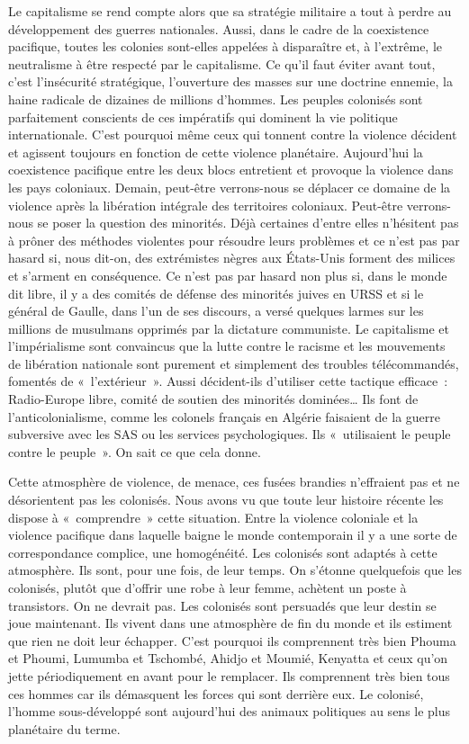 \documentclass[french,twoside]{book} %
\begin{document}
\noindent Le capitalisme se rend compte alors que sa stratégie militaire a tout à perdre au développement des guerres nationales. Aussi, dans le cadre de la coexistence pacifique, toutes les colonies sont-elles appelées à disparaître et, à l’extrême, le neutralisme à être respecté par le capitalisme. Ce qu’il faut éviter avant tout, c’est l’insécurité stratégique, l’ouverture des masses sur une doctrine ennemie, la haine radicale de dizaines de millions d’hommes. Les peuples colonisés sont parfaitement conscients de ces impératifs qui dominent la vie politique internationale.   C’est pourquoi même ceux qui tonnent contre la violence décident et agissent toujours en fonction de cette violence planétaire. Aujourd’hui la coexistence pacifique entre les deux blocs entretient et provoque la violence dans les pays coloniaux. Demain, peut-être verrons-nous se déplacer ce domaine de la violence après la libération intégrale des territoires coloniaux. Peut-être verrons-nous se poser la question des minorités. Déjà certaines d’entre elles n’hésitent pas à prôner des méthodes violentes pour résoudre leurs problèmes et ce n’est pas par hasard si, nous dit-on, des extrémistes nègres aux États-Unis forment des milices et s’arment en conséquence. Ce n’est pas par hasard non plus si, dans le monde dit libre, il y a des comités de défense des minorités juives en URSS et si le général de Gaulle, dans l’un de ses discours, a versé quelques larmes sur les millions de musulmans opprimés par la dictature communiste. Le capitalisme et l’impérialisme sont convaincus que la lutte contre le racisme et les mouvements de libération nationale sont purement et simplement des troubles télécommandés, fomentés de « l’extérieur ». Aussi décident-ils d’utiliser cette tactique efficace : Radio-Europe libre, comité de soutien des minorités dominées… Ils font de l’anticolonialisme, comme les colonels français en Algérie faisaient de la guerre subversive avec les SAS ou les services psychologiques. Ils « utilisaient le peuple contre le peuple ». On sait ce que cela donne.\par
Cette atmosphère de violence, de menace, ces fusées brandies n’effraient pas et ne désorientent pas les colonisés. Nous avons vu que toute leur histoire récente les dispose à « comprendre » cette situation. Entre la violence coloniale et la violence pacifique dans laquelle baigne le monde contemporain il y a une sorte de correspondance complice, une homogénéité. Les colonisés sont adaptés à cette atmosphère. Ils sont, pour une fois, de leur temps. On s’étonne quelquefois que les colonisés, plutôt que d’offrir une robe à leur femme, achètent un poste à transistors. On ne devrait pas. Les colonisés sont persuadés que leur destin se joue maintenant. Ils vivent dans une atmosphère   de fin du monde et ils estiment que rien ne doit leur échapper. C’est pourquoi ils comprennent très bien Phouma et Phoumi, Lumumba et Tschombé, Ahidjo et Moumié, Kenyatta et ceux qu’on jette périodiquement en avant pour le remplacer. Ils comprennent très bien tous ces hommes car ils démasquent les forces qui sont derrière eux. Le colonisé, l’homme sous-développé sont aujourd’hui des animaux politiques au sens le plus planétaire du terme.\par
\end{document}
